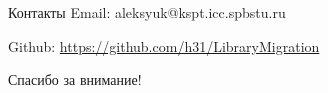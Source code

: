 \documentclass[12pt]{beamer}
\begin{document}
\begin{frame}[t]{Контакты}
	Email: aleksyuk@kspt.icc.spbstu.ru
	
	Github: \url{https://github.com/h31/LibraryMigration}
	
	\vspace{1cm}
	\begin{center}
		\Large
		Спасибо за внимание!
	\end{center}
\end{frame}
\end{document}
